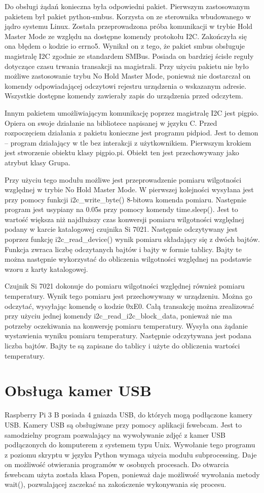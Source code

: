\documentclass[a4paper,12pt,twoside]{report}
\begin{document}
Do obsługi żądań konieczna była odpowiedni pakiet. Pierwszym zastosowanym pakietem był pakiet python-smbus. Korzysta on ze sterownika wbudowanego w jądro systemu Linux. Została przeprowadzona próba komunikacji w trybie Hold Master Mode ze względu na dostępne komendy protokołu I2C. Zakończyła się ona błędem o kodzie io errno5. Wynikał on z tego, że pakiet smbus obsługuje magistralę I2C zgodnie ze standardem SMBus. Posiada on bardziej ścisłe reguły dotyczące czasu trwania transakcji na magistrali. Przy użyciu pakietu nie było możliwe zastosowanie trybu No Hold Master Mode, ponieważ nie dostarczał on komendy odpowiadającej odczytowi rejestru urządzenia o wskazanym adresie. Wszystkie dostępne komendy zawierały zapis do urządzenia przed odczytem.

Innym pakietem umożliwiającym komunikację poprzez magistralę I2C jest pigpio. Opiera on swoje działanie na bibliotece napisanej w języku C. Przed rozpoczęciem działania z pakietu konieczne jest programu pidpiod. Jest to demon -- program działający w tle bez interakcji z użytkownikiem. Pierwszym krokiem jest stworzenie obiektu klasy pigpio.pi. Obiekt ten jest przechowywany jako atrybut klasy Grupa. 

Przy użyciu tego modułu możliwe jest przeprowadzenie pomiaru wilgotności względnej w trybie No Hold Master Mode. W pierwszej kolejności wysyłana jest przy pomocy funkcji i2c{\_}write{\_}byte() 8-bitowa komenda pomiaru. Następnie program jest usypiany na 0.05s przy pomocy komendy time.sleep(). Jest to wartość większa niż najdłuższy czas konwersji pomiaru wilgotności względnej podany w karcie katalogowej czujnika Si 7021. Następnie odczytywany jest poprzez funkcję i2c{\_}read{\_}device() wynik pomiaru składający się z dwóch bajtów. Funkcja zwraca liczbę odczytanych bajtów i bajty w formie tablicy. Bajty te można następnie wykorzystać do obliczenia wilgotności względnej na podstawie wzoru z karty katalogowej. 

Czujnik Si 7021 dokonuje do pomiaru wilgotności względnej również pomiaru temperatury. Wynik tego pomiaru jest przechowywany w urządzeniu. Można go odczytać, wysyłając komendę o kodzie 0xE0. Całą transakcję można zrealizować przy użyciu jednej komendy i2c{\_}read{\_}i2c{\_}block{\_}data, ponieważ nie ma potrzeby oczekiwania na konwersję pomiaru temperatury. Wysyła ona żądanie wystawienia wyniku pomiaru temperatury. Następnie odczytywana jest podana liczba 
bajtów. Bajty te są zapisane do tablicy i użyte do obliczenia wartości temperatury. 
\section{Obsługa kamer USB}
Raspberry Pi 3 B posiada 4 gniazda USB, do których mogą podłączone kamery USB. Kamery USB są obsługiwane przy pomocy aplikacji fswebcam. Jest to samodzielny program pozwalający na wywoływanie zdjęć z kamer USB podłączonych do komputerem z systemem typu Unix. Wywołanie tego programu z poziomu skryptu w języku Python wymaga użycia modułu subprocessing. Daje on możliwość otwierania programów w osobnych procesach. Do otwarcia fswebcam użyta została klasa Popen, ponieważ daje możliwość wywołania metody wait(), pozwalającej zaczekać na zakończenie wykonywania się procesu. 
\end{document}
